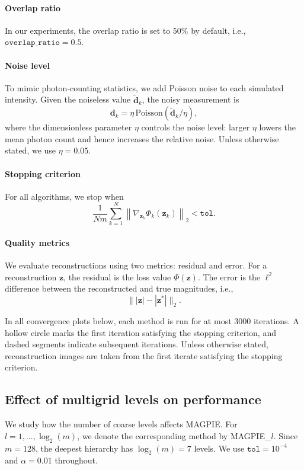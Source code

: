 \documentclass{article}
\numberwithin{equation}{section}
\begin{document}
\paragraph{Overlap ratio}
In our experiments, the overlap ratio is set to 50\% by default, i.e., $\texttt{overlap\_ratio}=0.5$.

\paragraph{Noise level}
To mimic photon-counting statistics, we add Poisson noise to each simulated intensity. Given the noiseless value $\widetilde{\bm{d}}_k$, the noisy measurement is
\begin{equation*}
    \bm{d}_k = \eta\,\mathrm{Poisson}\!\left(\widetilde{\bm{d}}_k/\eta\right),
\end{equation*}
where the dimensionless parameter $\eta$ controls the noise level: larger $\eta$ lowers the mean photon count and hence increases the relative noise. Unless otherwise stated, we use $\eta=0.05$.

\paragraph{Stopping criterion}
For all algorithms, we stop when
\begin{equation*}
    \frac{1}{Nm}\sum_{k=1}^{N}\left\|\nabla_{\bm z_k}\Phi_k(\bm z_k)\right\|_2 < \texttt{tol}.
\end{equation*}

\paragraph{Quality metrics}
We evaluate reconstructions using two metrics: residual and error. For a reconstruction $\bm{z}$, the residual is the loss value $\Phi(\bm{z})$. The error is the $\ell^2$ difference between the reconstructed and true magnitudes, i.e.,
\begin{equation*}
    \||\bm{z}| - |\bm{z}^*|\|_2.
\end{equation*}

{In all convergence plots below, each method is run for at most 3000 iterations. A hollow circle marks the first iteration satisfying the stopping criterion, and dashed segments indicate subsequent iterations. Unless otherwise stated, reconstruction images are taken from the first iterate satisfying the stopping criterion.}
\subsection{Effect of multigrid levels on performance}\label{sec:levels}
We study how the number of coarse levels affects MAGPIE. For $l=1,\ldots,\log_2(m)$, we denote the corresponding method by MAGPIE\_$l$. Since $m=128$, the deepest hierarchy has $\log_2(m)=7$ levels. We use $\texttt{tol}=10^{-4}$ and $\alpha=0.01$ throughout.
\end{document}
